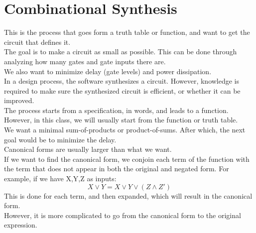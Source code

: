 \documentclass[nobib]{tufte-handout}
\begin{document}
\section{Combinational Synthesis}
This is the process that goes form a truth table or function, and want to get
the circuit that defines it.\\ The goal is to make a circuit as small as
possible. This can be done through analyzing how many gates and gate inputs
there are.\\ We also want to minimize delay (gate levels) and power
dissipation.\\ In a design process, the software synthesizes a circuit.
However, knowledge is required to make sure the synthesized circuit is
efficient, or whether it can be improved.\\ The process starts from a
specification, in words, and leads to a function. However, in this class, we
will usually start from the function or truth table.\\ We want a minimal
sum-of-products or product-of-sums. After which, the next goal would be to
minimize the delay.\\ Canonical forms are usually larger than what we want.\\
If we want to find the canonical form, we conjoin each term of the function
with the term that does not appear in both the original and negated form. For
example, if we have X,Y,Z as inputs:
\begin{equation*}
    X\lor Y = X\lor Y \lor(Z\land Z')
\end{equation*}
This is done for each term, and then expanded, which will result in the canonical form.\\
However, it is more complicated to go from the canonical form to the original expression.\\
\end{document}

